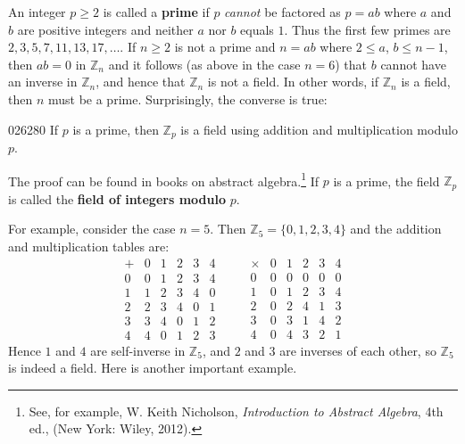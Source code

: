 An integer $p \geq 2$ is called a \textbf{prime} if $p$ \textit{cannot} be factored as $p = ab$ where $a$ and $b$ are positive integers and neither $a$ nor $b$ equals $1$. Thus the first few primes are $2, 3, 5, 7, 11, 13, 17, \dots$. If $n \geq 2$ is not a prime and $n = ab$ where $2 \leq a$, $b \leq n - 1$, then $ab = 0$ in $\mathbb{Z}_n$ and it follows (as above in the case $n = 6$) that $b$ cannot have an inverse in $\mathbb{Z}_n$, and hence that $\mathbb{Z}_n$ is not a field. In other words, if $\mathbb{Z}_n$ is a field, then $n$ must be a prime. Surprisingly, the converse is true:

\begin{theorem}{}{026280}
If $p$ is a prime, then $\mathbb{Z}_p$ is a field using addition and multiplication modulo $p$.
\end{theorem}

\noindent The proof can be found in books on abstract algebra.\footnote{See, for example, W. Keith Nicholson, \textit{Introduction to Abstract Algebra}, 4th ed., (New York: Wiley, 2012).}
 If $p$ is a prime, the field $\mathbb{Z}_p$ is called the \textbf{field of integers modulo} $p$.

For example, consider the case $n = 5$. Then $\mathbb{Z}_5 = \{0, 1, 2, 3, 4\}$ and the addition and multiplication tables are:
\begin{equation*}
\begin{array}{c|ccccc}
+ & 0 & 1 & 2 & 3 & 4 \\ \hline
0 & 0 & 1 & 2 & 3 & 4  \\
1 & 1 & 2 & 3 & 4 & 0  \\
2 & 2 & 3 & 4 & 0 & 1  \\
3 & 3 & 4 & 0 & 1 & 2  \\
4 & 4 & 0 & 1 & 2 & 3  
\end{array} \quad \quad  \begin{array}{c|ccccc}
\times & 0 & 1 & 2 & 3 & 4 \\ \hline
0 & 0 & 0 & 0 & 0 & 0  \\
1 & 0 & 1 & 2 & 3 & 4  \\
2 & 0 & 2 & 4 & 1 & 3  \\
3 & 0 & 3 & 1 & 4 & 2  \\
4 & 0 & 4 & 3 & 2 & 1 
\end{array}
\end{equation*}
Hence $1$ and $4$ are self-inverse in $\mathbb{Z}_5$, and $2$ and $3$ are inverses of each other, so $\mathbb{Z}_5$ is indeed a field. Here is another important example.

